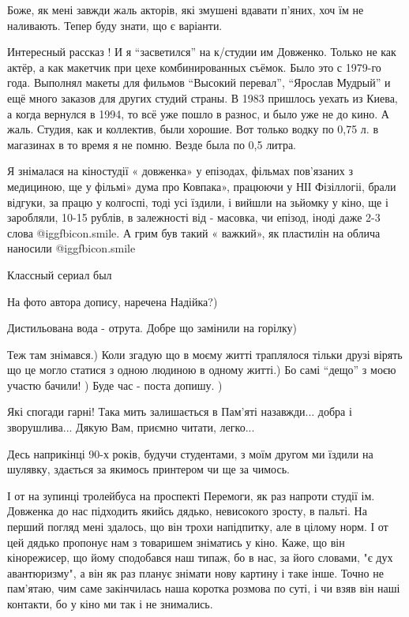 \begin{itemize}
\begin{itemize}
\end{itemize} %

Боже, як мені завжди жаль акторів, які змушені вдавати п'яних, хоч їм не наливають. Тепер буду знати, що є варіанти.


Интересный рассказ ! И я \enquote{засветился} на к/студии им Довженко. Только не как
актёр, а как макетчик при цехе комбинированных съёмок. Было это с 1979-го года.
Выполнял макеты для фильмов \enquote{Высокий перевал}, \enquote{Ярослав Мудрый} и ещё много
заказов для других студий страны. В 1983 пришлось уехать из Киева, а когда
вернулся в 1994, то всё уже пошло в разнос, и было уже не до кино. А жаль.
Студия, как и коллектив, были хорошие. Вот только водку по 0,75 л. в магазинах
в то время я не помню. Везде была по 0,5 литра.


Я знімалася на кіностудії « довженка» у епізодах, фільмах пов’язаних з
медициною, ще у фільмі» дума про Ковпака», працюючи у НІІ Фізіллогіі, брали
відгуки, за працю у колгоспі, тоді усі їздили, і вийшли на зьйомку у кіно, ще
і заробляли, 10-15 рублів, в залежності від - масовка, чи епізод, іноді даже
2-3 слова  @igg{fbicon.smile}. А грим був такий « важкий», як пластилін на облича наносили  @igg{fbicon.smile} 

Классный сериал был

На фото автора допису, наречена Надійка?)

Дистильована вода - отрута. Добре що замінили на горілку)


Теж там знімався.) Коли згадую що в моєму житті траплялося тільки друзі вірять
що це могло статися з одною людиною в одному житті.) Бо самі \enquote{дещо} з моєю
участю бачили! ) Буде час - поста допишу. )


Які спогади гарні! Така мить залишається в Пам'яті назавжди... добра і
зворушлива... Дякую Вам, приємно читати, легко...



Десь наприкінці 90-х років, будучи студентами, з моїм другом ми їздили на
шулявку, здається за якимось принтером чи ще за чимось.

І от на зупинці тролейбуса на проспекті Перемоги, як раз напроти студії ім.
Довженка до нас підходить якийсь дядько, невисокого зросту, в пальті. На перший
погляд мені здалось, що він трохи напідпитку, але в цілому норм. І от цей
дядько пропонує нам з товаришем зніматись у кіно. Каже, що він кінорежисер, що
йому сподобався наш типаж, бо в нас, за його словами, "є дух авантюризму", а
він як раз планує знімати нову картину і таке інше. Точно не пам'ятаю, чим саме
закінчилась наша коротка розмова по суті, і чи взяв він наші контакти, бо у
кіно ми так і не знимались.


\end{itemize}
